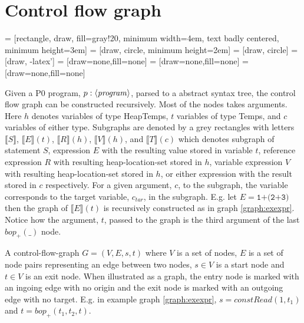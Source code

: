 \section{Control flow graph}
\label{sec:cfg}
 = [rectangle, draw, fill=gray!20,  minimum width=4em, text badly centered, minimum height=3em]
 = [draw, circle, minimum height=2em]
 = [draw, circle]
 = [draw, -latex']
 = [draw=none,fill=none]
 = [draw=none,fill=none]
 = [draw=none,fill=none]
\newcommand{\subt}[1]{\llbracket #1\rrbracket}

Given a P0 program, $p : \langle\mathit{program}\rangle$, parsed to a abstract syntax tree, the control flow graph can be constructed recursively. Most of the nodes takes arguments. Here $h$ denotes variables of type HeapTemps, $t$ variables of type Temps, and $c$ variables of either type. Subgraphs are denoted by a grey rectangles with letters $\subt{S}$, $\subt{E}(t)$, $\subt{R}(h)$, $\subt{V}(h)$, and $\subt{T}(c)$ which denotes subgraph of statement $S$, expression $E$ with the resulting value stored in variable $t$, reference expression $R$ with resulting heap-location-set stored in $h$, variable expression $V$ with resulting heap-location-set stored in $h$, or either expression with the result stored in $c$ respectively. For a given argument, $c$, to the subgraph, the variable corresponds to the target variable, $c_{tar}$, in the subgraph. E.g. let  $E = \texttt{1+(2+3)}$ then the graph of $\subt{E}(t)$ is recursively constructed as in graph \ref{graph:exexpr}. Notice how the argument, $t$, passed to the graph is the third argument of the last $\mathit{bop}_+(\_)$ node.
\begin{definition}
\label{def:cfg}
A control-flow-graph $G = (V,E, s, t)$ where $V$ is a set of nodes, $E$ is a set of node pairs representing an edge between two nodes, $s\in V$ is a start node and $t\in V$ is an exit node. When illustrated as a graph, the entry node is marked with an ingoing edge with no origin and the exit node is marked with an outgoing edge with no target. E.g. in example graph \ref{graph:exexpr}, $s = \mathit{constRead}(1, t_1)$ and $t = \mathit{bop}_+(t_1, t_2, t)$.
\end{definition}

